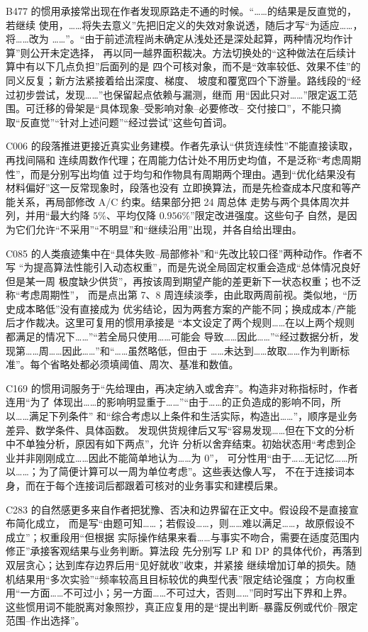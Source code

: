 \documentclass[UTF8,a4paper,12pt]{ctexart}
\begin{document}
B477 的惯用承接常出现在作者发现原路走不通的时候。“……的结果是反直觉的，若继续
使用，……将失去意义”先把旧定义的失效对象说透，随后才写“为适应……，将……改为
……”。“由于前述流程尚未确定从浅处还是深处起算，两种情况均作计算”则公开未定选择，
再以同一越界面积裁决。方法切换处的“这种做法在后续计算中有以下几点负担”后面列的是
四个可核对象，而不是“效率较低、效果不佳”的同义反复；新方法紧接着给出深度、梯度、
坡度和覆宽四个下游量。路线段的“经过初步尝试，发现……”也保留起点依赖与漏测，继而
用“因此只对……”限定返工范围。可迁移的骨架是“具体现象--受影响对象--必要修改--
交付接口”，不能只摘取“反直觉”“针对上述问题”“经过尝试”这些句首词。

C006 的段落推进更接近真实业务建模。作者先承认“供货连续性”不能直接读取，再找间隔和
连续周数作代理；在周能力估计处不用历史均值，不是泛称“考虑周期性”，而是分别写出均值
过于均匀和作物具有周期两个理由。遇到“优化结果没有材料偏好”这一反常现象时，段落也没有
立即换算法，而是先检查成本尺度和等产能关系，再局部修改 A/C 约束。结果部分把 24 周总体
走势与两个具体周次并列，并用“最大约降 $5\%$、平均仅降 $0.956\%$”限定改进强度。这些句子
自然，是因为它们允许“不采用”“不明显”和“继续沿用”出现，并各自给出理由。

C085 的人类痕迹集中在“具体失败--局部修补”和“先改比较口径”两种动作。作者不写
“为提高算法性能引入动态权重”，而是先说全局固定权重会造成“总体情况良好但是某一周
极度缺少供货”，再按该周到期望产能的差更新下一状态权重；也不泛称“考虑周期性”，
而是点出第 7、8 周连续淡季，由此取两周前视。类似地，“历史成本略低”没有直接成为
优劣结论，因为两套方案的产能不同；换成成本/产能后才作裁决。这里可复用的惯用承接是
“本文设定了两个规则……在以上两个规则都满足的情况下……”“若全局只使用……可能会
导致……因此……”“经过数据分析，发现第……周……因此……”和“……虽然略低，但由于
……未达到……故取……作为判断标准”。每个省略处都必须填阈值、周次、基准和数值。

C169 的惯用词服务于“先给理由，再决定纳入或舍弃”。构造非对称指标时，作者连用“为了
体现出……的影响明显重于……”“由于……的正负造成的影响不同，所以……满足下列条件”
和“综合考虑以上条件和生活实际，构造出……”，顺序是业务差异、数学条件、具体函数。
发现供货规律后又写“容易发现……但在下文的分析中不单独分析，原因有如下两点”，允许
分析以舍弃结束。初始状态用“考虑到企业并非刚刚成立……因此不能简单地认为……为 0”，
可分性用“由于……无记忆……所以……；为了简便计算可以一周为单位考虑”。这些表达像人写，
不在于连接词本身，而在于每个连接词后都跟着可核对的业务事实和建模后果。

C283 的自然感更多来自作者把犹豫、否决和边界留在正文中。假设段不是直接宣布简化成立，
而是写“由题可知……；若假设……，则……难以满足……，故原假设不成立”；权重段用“但根据
实际操作结果来看……与事实不吻合，需要在适度范围内修正”承接客观结果与业务判断。算法段
先分别写 LP 和 DP 的具体代价，再落到双层贪心；达到库存边界后用“见好就收”收束，并紧接
继续增加订单的损失。随机结果用“多次实验”“频率较高且目标较优的典型代表”限定结论强度；
方向权重用“一方面……不可过小；另一方面……不可过大，否则……”同时写出下界和上界。
这些惯用词不能脱离对象照抄，真正应复用的是“提出判断--暴露反例或代价--限定范围--作出选择”。
\end{document}
